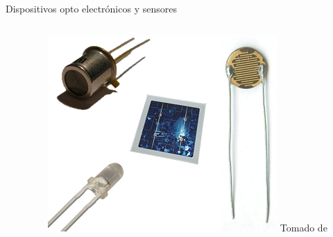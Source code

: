 \documentclass[aspectratio=169]{beamer}
\begin{document}
\begin{frame}{Dispositivos opto electrónicos y sensores}
    \begin{columns}[onlytextwidth]
        \begin{column}{0.55\textwidth}
            
        \end{column}
        \begin{column}{0.45\textwidth}
            \centering
            \includegraphics[width = 1\linewidth]{fig/Optica/Light_sensor.png}
            \tiny{Tomado de \cite{Fraden_2016}}
        \end{column}
    \end{columns}
\end{frame}
\end{document}
